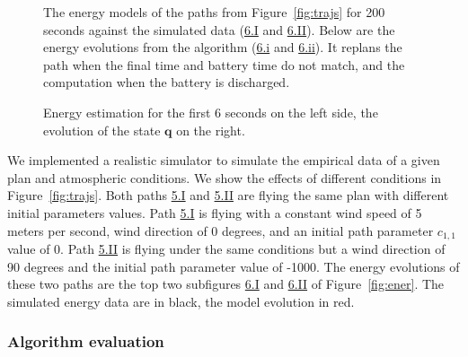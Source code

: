 \begin{figure}[p]
  \centering
  \selectfont
  \footnotesize    
  
  \caption[Energy models of different static and dynamic plans]{The energy models of the paths from Figure~\ref{fig:trajs} for 200 seconds against the simulated data (\hyperref[fig:ener:static-I]{6.I} and \hyperref[fig:ener:static-II]{6.II}). Below are the energy evolutions from the algorithm (\hyperref[fig:ener-dyn-i]{6.i} and \hyperref[fig:ener-dyn-ii]{6.ii}). It replans the path when the final time and battery time do not match, and the computation when the battery is discharged.}
  \label{fig:ener-revised}
\end{figure}





\begin{figure}[p]
  \centering
  \selectfont
  \footnotesize    
  
  \caption[Energy estimation and evolution of the state]{Energy estimation for the first 6 seconds on the left side, the evolution of the state $\mathbf{q}$ on the right.}
  \label{fig:evols-revised}
\end{figure}



We implemented a realistic simulator to simulate the empirical data of a given plan and atmospheric conditions. We show the effects of different conditions in Figure~\ref{fig:trajs}. Both paths \hyperref[fig:trajs-I-static]{5.I} and \hyperref[fig:trajs-II-static]{5.II} are flying the same plan with different initial parameters values. Path \hyperref[fig:trajs-I-static]{5.I} is flying with a constant wind speed of 5 meters per second, wind direction of 0 degrees, and an initial path parameter $c_{1,1}$ value of 0. Path  \hyperref[fig:trajs-II-static]{5.II} is flying under the same conditions but a wind direction of 90 degrees and the initial path parameter value of -1000. The energy evolutions of these two paths are the top two subfigures \hyperref[fig:ener:static-I]{6.I} and \hyperref[fig:ener:static-II]{6.II} of Figure~\ref{fig:ener}. The simulated energy data are in black, the model evolution in red.

\subsubsection*{Algorithm evaluation}


